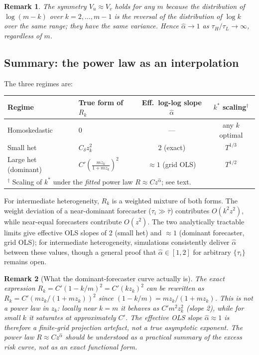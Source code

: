 \documentclass[12pt]{article}
\newtheorem{remark}{Remark}
\theoremstyle{definition}
\begin{document}
\begin{remark}
  The symmetry $V_u \approx V_v$ holds for any $m$ because the distribution of
  $\log(m-k)$ over $k=2,\ldots,m-1$ is the reversal of the distribution of
  $\log k$ over the same range; they have the same variance.
  Hence $\hat\alpha \to 1$ as $\tau_H/\tau_L \to \infty$, regardless of $m$.
\end{remark}

\subsection{Summary: the power law as an interpolation}

The three regimes are:

\medskip
\begin{center}
\begin{tabular}{llcc}
\toprule
Regime & True form of $R_k$ & Eff.\ log-log slope $\hat\alpha$ & $k^*$ scaling$^\dagger$ \\
\midrule
Homoskedastic   & $0$                          & ---              & any $k$ optimal \\
Small het       & $C_\delta z_k^2$             & $2$ (exact)      & $T^{1/3}$ \\
Large het (dominant) & $C'\!\left(\tfrac{mz_k}{1+mz_k}\right)^{\!2}$ & $\approx 1$ (grid OLS) & $T^{1/2}$ \\
\bottomrule
\multicolumn{4}{l}{$^\dagger$ Scaling of $k^*$ under the \emph{fitted} power law $R \approx Cz^{\hat\alpha}$; see text.}
\end{tabular}
\end{center}
\medskip

For intermediate heterogeneity, $R_k$ is a weighted mixture of both forms.
The weight deviation of a near-dominant forecaster ($\tau_i \gg \bar\tau$) contributes
$O(k^2 z^2)$, while near-equal forecasters contribute $O(z^2)$.
The two analytically tractable limits give effective OLS slopes of 2 (small het)
and $\approx 1$ (dominant forecaster, grid OLS); for intermediate heterogeneity,
simulations consistently deliver $\hat\alpha$ between these values,
though a general proof that $\hat\alpha \in [1,2]$ for arbitrary $\{\tau_i\}$ remains open.

\begin{remark}[What the dominant-forecaster curve actually is]
  The exact expression $R_k = C'(1-k/m)^2 = C'(kz_k)^2$ can be rewritten as
  $R_k = C'(mz_k/(1+mz_k))^2$ since $(1-k/m) = mz_k/(1+mz_k)$.
  This is \emph{not} a power law in $z_k$: locally near $k=m$ it behaves as
  $C'm^2 z_k^2$ (slope 2), while for small $k$ it saturates at approximately $C'$.
  The effective OLS slope $\hat\alpha \approx 1$ is therefore a finite-grid
  projection artefact, not a true asymptotic exponent.
  The power law $R \approx Cz^{\hat\alpha}$ should be understood as a
  \emph{practical summary} of the excess risk curve, not as an exact functional form.
\end{remark}
\end{document}
